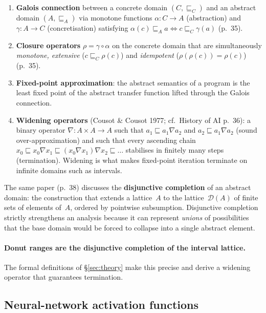 \documentclass[11pt,a4paper]{article}
\theoremstyle{plain}
\begin{document}
\begin{enumerate}
\item \textbf{Galois connection} between a concrete domain
  $(C,\sqsubseteq_C)$ and an abstract domain $(A,\sqsubseteq_A)$ via
  monotone functions $\alpha\colon C\to A$ (abstraction) and
  $\gamma\colon A\to C$ (concretisation) satisfying
  $\alpha(c)\sqsubseteq_A a \iff c\sqsubseteq_C \gamma(a)$ (p.~35).
\item \textbf{Closure operators} $\rho = \gamma\circ\alpha$ on the
  concrete domain that are simultaneously \emph{monotone, extensive}
  ($c \sqsubseteq_C \rho(c)$) and \emph{idempotent}
  ($\rho(\rho(c)) = \rho(c)$) (p.~35).
\item \textbf{Fixed-point approximation}: the abstract semantics of a
  program is the least fixed point of the abstract transfer function
  lifted through the Galois connection.
\item \textbf{Widening operators} (Cousot \& Cousot 1977; cf.\ History of AI p.~36): a binary
  operator $\nabla\colon A\times A\to A$ such that
  $a_1\sqsubseteq a_1\nabla a_2$ and $a_2\sqsubseteq a_1\nabla a_2$
  (sound over-approximation) and such that every ascending chain
  $x_0 \sqsubseteq x_0\nabla x_1 \sqsubseteq (x_0\nabla x_1)\nabla x_2
  \sqsubseteq\dots$ stabilises in finitely many steps (termination).
  Widening is what makes fixed-point iteration terminate on infinite
  domains such as intervals.
\end{enumerate}

The same paper (p.~38) discusses the \textbf{disjunctive completion}
of an abstract domain: the construction that extends a lattice~$A$ to
the lattice~$\mathcal{D}(A)$ of finite sets of elements of~$A$, ordered
by pointwise subsumption. Disjunctive completion strictly strengthens
an analysis because it can represent \emph{unions} of possibilities
that the base domain would be forced to collapse into a single
abstract element.

\paragraph{Donut ranges are the disjunctive completion of the interval
lattice.} The formal definitions of \S\ref{sec:theory} make this
precise and derive a widening operator that guarantees termination.

\subsection{Neural-network activation functions}
\end{document}
